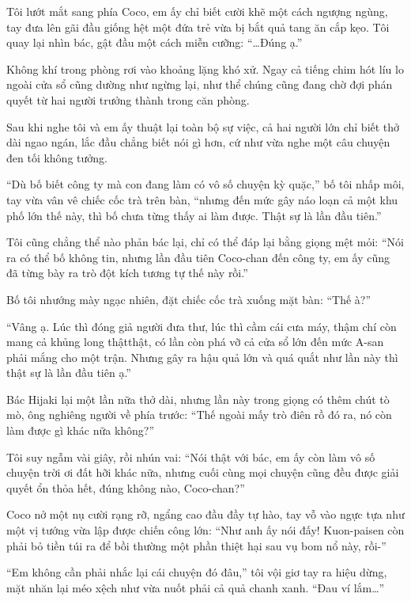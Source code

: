 \documentclass[../main.tex]{subfiles}
\begin{document}
Tôi lướt mắt sang phía Coco, em ấy chỉ biết cười khẽ một cách ngượng ngùng, tay đưa lên gãi đầu giống hệt một đứa trẻ vừa bị bắt quả tang ăn cắp kẹo. Tôi quay lại nhìn bác, gật đầu một cách miễn cưỡng: ``\dots Đúng ạ.''

Không khí trong phòng rơi vào khoảng lặng khó xử. Ngay cả tiếng chim hót líu lo ngoài cửa sổ cũng dường như ngừng lại, như thể chúng cũng đang chờ đợi phán quyết từ hai người trưởng thành trong căn phòng.

Sau khi nghe tôi và em ấy thuật lại toàn bộ sự việc, cả hai người lớn chỉ biết thở dài ngao ngán, lắc đầu chẳng biết nói gì hơn, cứ như vừa nghe một câu chuyện đen tối không tưởng.

``Dù bố biết công ty mà con đang làm có vô số chuyện kỳ quặc,'' bố tôi nhấp môi, tay vừa vân vê chiếc cốc trà trên bàn, ``nhưng đến mức gây náo loạn cả một khu phố lớn thế này, thì bố chưa từng thấy ai làm được. Thật sự là lần đầu tiên.''

Tôi cũng chẳng thể nào phản bác lại, chỉ có thể đáp lại bằng giọng mệt mỏi: ``Nói ra có thể bố không tin, nhưng lần đầu tiên Coco-chan đến công ty, em ấy cũng đã từng bày ra trò đột kích tương tự thế này rồi.''

Bố tôi nhướng mày ngạc nhiên, đặt chiếc cốc trà xuống mặt bàn: ``Thế à?''

``Vâng ạ. Lúc thì đóng giả người đưa thư, lúc thì cầm cái cưa máy, thậm chí còn mang cả khủng long thậtthật, có lần còn phá vỡ cả cửa sổ lớn đến mức A-san phải mắng cho một trận. Nhưng gây ra hậu quả lớn và quá quắt như lần này thì thật sự là lần đầu tiên ạ.''

Bác Hijaki lại một lần nữa thở dài, nhưng lần này trong giọng có thêm chút tò mò, ông nghiêng người về phía trước: ``Thế ngoài mấy trò điên rồ đó ra, nó còn làm được gì khác nữa không?''

Tôi suy ngẫm vài giây, rồi nhún vai: ``Nói thật với bác, em ấy còn làm vô số chuyện trời ơi đất hỡi khác nữa, nhưng cuối cùng mọi chuyện cũng đều được giải quyết ổn thỏa hết, đúng không nào, Coco-chan?''

Coco nở một nụ cười rạng rỡ, ngẩng cao đầu đầy tự hào, tay vỗ vào ngực tựa như một vị tướng vừa lập được chiến công lớn: ``Như anh ấy nói đấy! Kuon-paisen còn phải bỏ tiền túi ra để bồi thường một phần thiệt hại sau vụ bom nổ này, rồi-''

``Em không cần phải nhắc lại cái chuyện đó đâu,'' tôi vội giơ tay ra hiệu dừng, mặt nhăn lại méo xệch như vừa nuốt phải cả quả chanh xanh. ``Đau ví lắm\dots''
\end{document}

